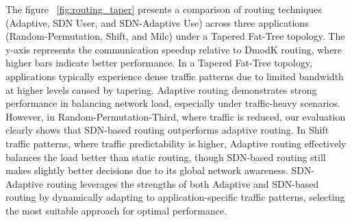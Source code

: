 The figure ~\ref{fig:routing_taper} presents a comparison of routing techniques (Adaptive, SDN User, and SDN-Adaptive Use) across three applications (Random-Permutation, Shift, and Milc) under a Tapered Fat-Tree topology. The y-axis represents the communication speedup relative to DmodK routing, where higher bars indicate better performance. In a Tapered Fat-Tree topology, applications typically experience dense traffic patterns due to limited bandwidth at higher levels caused by tapering. Adaptive routing demonstrates strong performance in balancing network load, especially under traffic-heavy scenarios. However, in Random-Permutation-Third, where traffic is reduced, our evaluation clearly shows that SDN-based routing outperforms adaptive routing. In Shift traffic patterns, where traffic predictability is higher, Adaptive routing effectively balances the load better than static routing, though SDN-based routing still makes slightly better decisions due to its global network awareness. SDN-Adaptive routing leverages the strengths of both Adaptive and SDN-based routing by dynamically adapting to application-specific traffic patterns, selecting the most suitable approach for optimal performance. 

